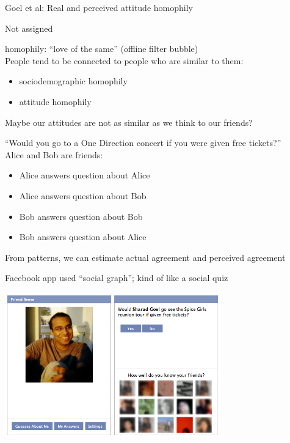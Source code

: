 \documentclass[aspectratio=169]{beamer}
\begin{document}
\begin{frame}

\LARGE{Goel et al: Real and perceived attitude homophily}

\vfill
Not assigned

\end{frame}
\begin{frame}

homophily: ``love of the same'' (offline filter bubble)\\

People tend to be connected to people who are similar to them:
\begin{itemize}
\item sociodemographic homophily
\item attitude homophily
\end{itemize}

\vfill

Maybe our attitudes are not as similar as we think to our friends?

\end{frame}
\begin{frame}

``Would you go to a One Direction concert if you were given free tickets?'' \\

Alice and Bob are friends:
\begin{itemize}
\item Alice answers question about Alice
\item Alice answers question about Bob
\item Bob answers question about Bob
\item Bob answers question about Alice
\end{itemize}

From patterns, we can estimate actual agreement and perceived agreement

\end{frame}
\begin{frame}

Facebook app used ``social graph''; kind of like a social quiz

\begin{center}
\includegraphics[width=0.7\textwidth]{figures/friendsense.png}
\end{center}

\end{frame}
\end{document}
